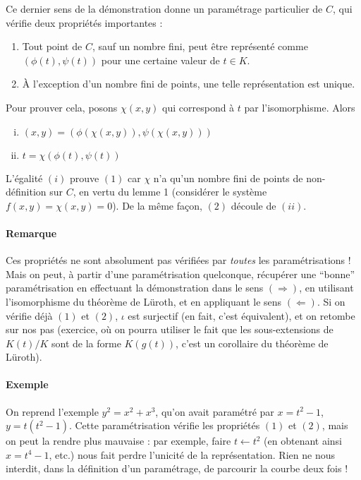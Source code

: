 \documentclass[a4paper, 11pt]{article}
\theoremstyle{definition}
\begin{document}
Ce dernier sens de la démonstration donne un paramétrage particulier
de $C$, qui vérifie deux propriétés importantes :
\begin{enumerate}[(1)]
\item Tout point de $C$, sauf un nombre fini, peut être représenté
  comme $(\phi(t),\psi(t))$ pour une certaine valeur de $t \in K$.
\item À l'exception d'un nombre fini de points, une telle
  représentation est unique.
\end{enumerate}
Pour prouver cela, posons $\chi(x,y)$ qui correspond à $t$ par
l'isomorphisme. Alors
\begin{enumerate}[(i)]
\item $(x,y) = (\phi(\chi(x,y)), \psi(\chi(x,y)))$
\item $t = \chi(\phi(t),\psi(t))$
\end{enumerate}
L'égalité $(i)$ prouve $(1)$ car $\chi$ n'a qu'un nombre fini de
points de non-définition sur $C$, en vertu du lemme 1 (considérer le
système $f(x,y) = \chi(x,y) = 0$). De la même façon, $(2)$ découle de
$(ii)$.

\paragraph{Remarque} Ces propriétés ne sont absolument pas vérifiées
par \emph{toutes} les paramétrisations ! Mais on peut, à partir d'une
paramétrisation quelconque, récupérer une \enquote{bonne}
paramétrisation en effectuant la démonstration dans le sens
$(\Rightarrow)$, en utilisant l'isomorphisme du théorème de Lüroth, et
en appliquant le sens $(\Leftarrow)$. Si on vérifie déjà $(1)$ et
$(2)$, $\iota$ est surjectif (en fait, c'est équivalent), et on
retombe sur nos pas (exercice, où on pourra utiliser le fait que les
sous-extensions de $K(t)/K$ sont de la forme $K(g(t))$, c'est un
corollaire du théorème de Lüroth).

\paragraph{Exemple} On reprend l'exemple $y^2 = x^2 + x^3$, qu'on
avait paramétré par $x = t^2 - 1$, $y = t(t^2 - 1)$. Cette
paramétrisation vérifie les propriétés $(1)$ et $(2)$, mais on peut la
rendre plus mauvaise : par exemple, faire $t \leftarrow t^2$ (en
obtenant ainsi $x = t^4 - 1$, etc.) nous fait perdre l'unicité de la
représentation. Rien ne nous interdit, dans la définition d'un
paramétrage, de parcourir la courbe deux fois !
\end{document}
